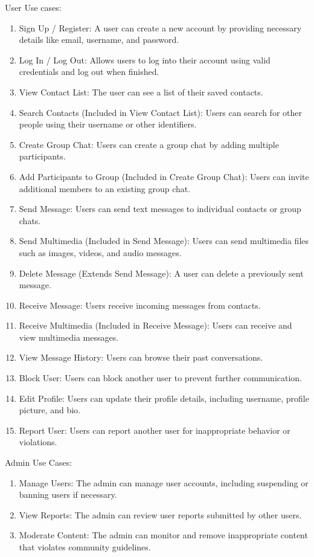 User Use cases: 
\begin{enumerate}
    \item Sign Up / Register: A user can create a new account by providing necessary details like email, username, and password.
    \item Log In / Log Out: Allows users to log into their account using valid credentials and log out when finished.
    \item View Contact List: The user can see a list of their saved contacts.
    \item Search Contacts (Included in View Contact List): Users can search for other people using their username or other identifiers.
    \item Create Group Chat: Users can create a group chat by adding multiple participants.
    \item Add Participants to Group (Included in Create Group Chat): Users can invite additional members to an existing group chat.
    \item Send Message: Users can send text messages to individual contacts or group chats.
    \item Send Multimedia (Included in Send Message): Users can send multimedia files such as images, videos, and audio messages.
    \item Delete Message (Extends Send Message): A user can delete a previously sent message.
    \item Receive Message: Users receive incoming messages from contacts.
    \item Receive Multimedia (Included in Receive Message): Users can receive and view multimedia messages.
    \item View Message History: Users can browse their past conversations.
    \item Block User: Users can block another user to prevent further communication.
    \item Edit Profile: Users can update their profile details, including username, profile picture, and bio.
    \item Report User: Users can report another user for inappropriate behavior or violations.    
\end{enumerate}

Admin Use Cases: 
\begin{enumerate}
    \item Manage Users: The admin can manage user accounts, including suspending or banning users if necessary.
    \item View Reports: The admin can review user reports submitted by other users.
    \item Moderate Content: The admin can monitor and remove inappropriate content that violates community guidelines.
\end{enumerate}


